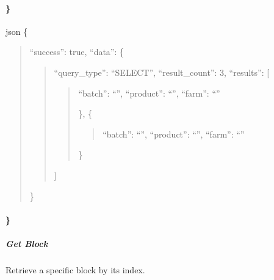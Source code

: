 \documentclass[letterpaper,10pt,english]{sphinxmanual}
\begin{document}
\paragraph{\}}
\label{\detokenize{api/rest-api:id33}}
\sphinxAtStartPar
{}
{\color{red}\bfseries{}\textasciigrave{}\textasciigrave{}}{\color{red}\bfseries{}\textasciigrave{}}json
\{
\begin{quote}

\sphinxAtStartPar
“success”: true,
“data”: \{
\begin{quote}

\sphinxAtStartPar
“query\_type”: “SELECT”,
“result\_count”: 3,
“results”: {[}
\begin{quote}
\begin{description}
\sphinxlineitem{\{}
\sphinxAtStartPar
“batch”: “”,
“product”: “”,
“farm”: “”

\end{description}

\sphinxAtStartPar
\},
\{
\begin{quote}

\sphinxAtStartPar
“batch”: “”,
“product”: “”,
“farm”: “”
\end{quote}

\sphinxAtStartPar
\}
\end{quote}

\sphinxAtStartPar
{]}
\end{quote}

\sphinxAtStartPar
\}
\end{quote}


\paragraph{\}}
\label{\detokenize{api/rest-api:id38}}

\subparagraph{Get Block}
\label{\detokenize{api/rest-api:get-block}}
\sphinxAtStartPar
Retrieve a specific block by its index.

\sphinxAtStartPar
{} 
\end{document}
